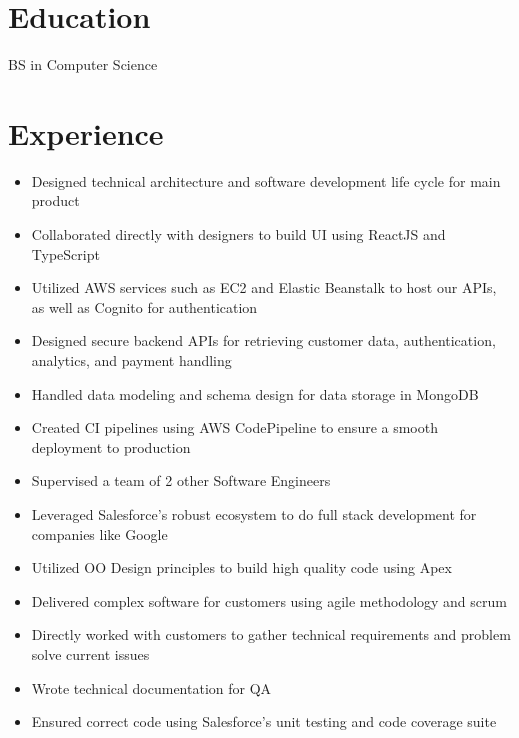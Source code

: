 \documentclass{cv}
\begin{document}

	\section{Education}
	BS in Computer Science

	\section{Experience}
	\begin{itemize}
		\item Designed technical architecture and software development life cycle for main product
		\item Collaborated directly with designers to build UI using ReactJS and TypeScript
		\item Utilized AWS services such as EC2 and Elastic Beanstalk to host our APIs, as well as Cognito for authentication
		\item Designed secure backend APIs for retrieving customer data, authentication, analytics, and payment handling
		\item Handled data modeling and schema design for data storage in MongoDB
		\item Created CI pipelines using AWS CodePipeline to ensure a smooth deployment to production
		\item Supervised a team of 2 other Software Engineers
	\end{itemize}

	\begin{itemize}
		\item Leveraged Salesforce's robust ecosystem to do full stack development for companies like Google
		\item Utilized OO Design principles to build high quality code using Apex
		\item Delivered complex software for customers using agile methodology and scrum
		\item Directly worked with customers to gather technical requirements and problem solve current issues
		\item Wrote technical documentation for QA
		\item Ensured correct code using Salesforce's unit testing and code coverage suite
	\end{itemize}
\end{document}
